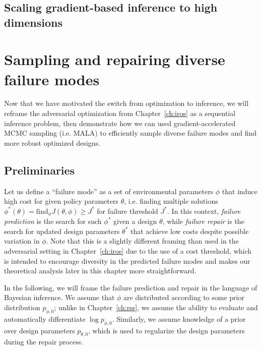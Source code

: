 {\subsection{Scaling gradient-based inference to high dimensions}


\section{Sampling and repairing diverse failure modes}


Now that we have motivated the switch from optimization to inference, we will reframe the adversarial optimization from Chapter~\ref{ch:iros} as a sequential inference problem, then demonstrate how we can used gradient-accelerated MCMC sampling (i.e. MALA) to efficiently sample diverse failure modes and find more robust optimized designs.

\subsection{Preliminaries}

Let us define a ``failure mode'' as a set of environmental parameters $\phi$ that induce high cost for given policy parameters $\theta$, i.e. finding multiple solutions $\phi^*(\theta) = \text{find}_\phi J(\theta, \phi) \geq J^*$ for failure threshold $J^*$. In this context, \textit{failure prediction} is the search for such $\phi^*$ given a design $\theta$, while \textit{failure repair} is the search for updated design parameters $\theta^*$ that achieve low costs despite possible variation in $\phi$. Note that this is a slightly different framing than used in the adversarial setting in Chapter~\ref{ch:iros} due to the use of a cost threshold, which is intended to encourage diversity in the predicted failure modes and makes our theoretical analysis later in this chapter more straightforward.

In the following, we will frame the failure prediction and repair in the language of Bayesian inference. We assume that $\phi$ are distributed according to some prior distribution $p_{\phi, 0}$; unlike in Chapter~\ref{ch:rss}, we assume the ability to evaluate and automatically differentiate $\log p_{\phi, 0}$. Similarly, we assume knowledge of a prior over design parameters $p_{\theta, 0}$, which is used to regularize the design parameters during the repair process.

}
